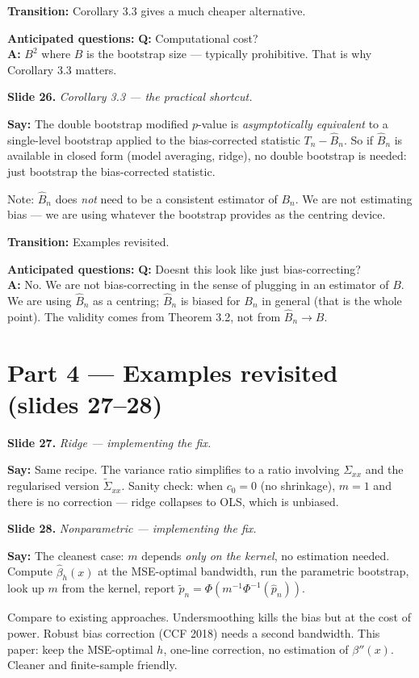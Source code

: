 \documentclass[11pt]{article}
\theoremstyle{definition}
\newcommand{\Tn}{T_{n}}
\newcommand{\Bn}{B_{n}}
\newcommand{\Bnh}{\hat{B}_{n}}
\newcommand{\pnh}{\hat{p}_{n}}
\newcommand{\pnt}{\tilde{p}_{n}}
\newcommand{\slide}[2]{%
  \medskip
  \noindent\colorbox{soft}{\parbox{\linewidth}{\textbf{Slide #1.} \textit{#2}}}
  \medskip
}
\newcommand{\say}[1]{\textbf{Say:} #1}
\newcommand{\trans}[1]{\textbf{Transition:} #1}
\newcommand{\Q}[2]{\noindent\textcolor{warn}{\textbf{Q:}} #1\\ \textcolor{accent}{\textbf{A:}} #2\par\smallskip}
\begin{document}
\trans{Corollary 3.3 gives a much cheaper alternative.}

\textbf{Anticipated questions:}
\Q{Computational cost?}
{$B^2$ where $B$ is the bootstrap size --- typically prohibitive. That is why
Corollary 3.3 matters.}

\slide{26}{Corollary 3.3 --- the practical shortcut.}
\say{The double bootstrap modified $p$-value is \emph{asymptotically equivalent}
to a single-level bootstrap applied to the bias-corrected statistic
$\Tn-\Bnh$. So if $\Bnh$ is available in closed form (model averaging, ridge),
no double bootstrap is needed: just bootstrap the bias-corrected statistic.

Note: $\Bnh$ does \emph{not} need to be a consistent estimator of $\Bn$.
We are not estimating bias --- we are using whatever the bootstrap provides
as the centring device.}

\trans{Examples revisited.}

\textbf{Anticipated questions:}
\Q{Doesnt this look like just bias-correcting?}
{No. We are not bias-correcting in the sense of plugging in an estimator
of $B$. We are using $\Bnh$ as a centring; $\Bnh$ is biased for $\Bn$ in
general (that is the whole point). The validity comes from Theorem 3.2,
not from $\Bnh\to B$.}

\section{Part 4 --- Examples revisited (slides 27--28)}

\slide{27}{Ridge --- implementing the fix.}
\say{Same recipe. The variance ratio simplifies to a ratio involving
$\Sigma_{xx}$ and the regularised version $\tilde\Sigma_{xx}$.
Sanity check: when $c_0=0$ (no shrinkage), $m=1$ and there is no correction ---
ridge collapses to OLS, which is unbiased.}

\slide{28}{Nonparametric --- implementing the fix.}
\say{The cleanest case: $m$ depends \emph{only on the kernel}, no estimation
needed. Compute $\hat\beta_h(x)$ at the MSE-optimal bandwidth, run the
parametric bootstrap, look up $m$ from the kernel, report
$\pnt=\Phi(m^{-1}\Phi^{-1}(\pnh))$.

Compare to existing approaches. Undersmoothing kills the bias but at the cost
of power. Robust bias correction (CCF 2018) needs a second bandwidth. This
paper: keep the MSE-optimal $h$, one-line correction, no estimation of
$\beta''(x)$. Cleaner and finite-sample friendly.}
\end{document}
